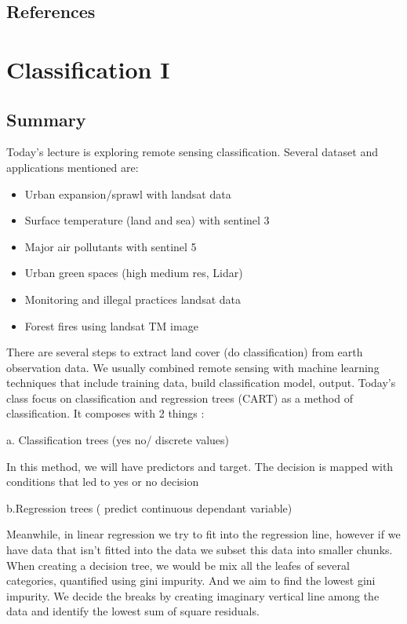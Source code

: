 \documentclass[
  letterpaper,
  DIV=11,
  numbers=noendperiod]{scrreprt}
\begin{document}
\hypertarget{references-2}{%
\section{References}\label{references-2}}


\hypertarget{classification-i}{%
\chapter{Classification I}\label{classification-i}}

\hypertarget{summary-5}{%
\section{Summary}\label{summary-5}}

Today's lecture is exploring remote sensing classification. Several
dataset and applications mentioned are:

\begin{itemize}
\item
  Urban expansion/sprawl with landsat data
\item
  Surface temperature (land and sea) with sentinel 3
\item
  Major air pollutants with sentinel 5
\item
  Urban green spaces (high medium res, Lidar)
\item
  Monitoring and illegal practices landsat data
\item
  Forest fires using landsat TM image
\end{itemize}

There are several steps to extract land cover (do classification) from
earth observation data. We usually combined remote sensing with machine
learning techniques that include training data, build classification
model, output. Today's class focus on classification and regression
trees (CART) as a method of classification. It composes with 2 things :

a. Classification trees (yes no/ discrete values)

In this method, we will have predictors and target. The decision is
mapped with conditions that led to yes or no decision

b.Regression trees ( predict continuous dependant variable)

Meanwhile, in linear regression we try to fit into the regression line,
however if we have data that isn't fitted into the data we subset this
data into smaller chunks. When creating a decision tree, we would be mix
all the leafes of several categories, quantified using gini impurity.
And we aim to find the lowest gini impurity. We decide the breaks by
creating imaginary vertical line among the data and identify the lowest
sum of square residuals.
\end{document}
